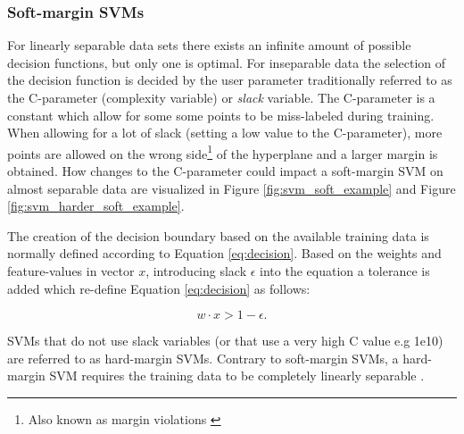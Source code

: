 \documentclass[a4paper,twoside]{bth}
\begin{document}
\subsubsection{Soft-margin SVMs}
\par For linearly separable data sets there exists an infinite amount of possible decision functions, but only one is optimal. For inseparable data the selection of the decision function is decided by the user parameter traditionally referred to as the C-parameter \cite{Cortes:1995:SN:218919.218929} (complexity variable) or \textit{slack} variable. The C-parameter is a constant which allow for some some points to be miss-labeled during training. When allowing for a lot of slack (setting a low value to the C-parameter), more points are allowed on the wrong side\footnote{Also known as margin violations \cite{Flach:2012:MLA:2490546}} of the hyperplane and a larger margin is obtained. How changes to the C-parameter could impact a soft-margin SVM on almost separable data are visualized in Figure \ref{fig:svm_soft_example} and Figure \ref{fig:svm_harder_soft_example}.

\par The creation of the decision boundary based on the available training data is normally defined according to Equation \ref{eq:decision}. Based on the weights and feature-values in vector $x$, introducing slack $\epsilon$ into the equation a tolerance is added which re-define Equation \ref{eq:decision} as follows:

\begin{equation}\label{eq:soft_decision}
    w \cdot x > 1 - \epsilon. 
\end{equation}

\par SVMs that do not use slack variables (or that use a very high C value e.g 1e10)  are referred to as hard-margin SVMs. Contrary to soft-margin SVMs, a hard-margin SVM requires the training data to be completely linearly separable \cite{Cortes:1995:SN:218919.218929}.
\end{document}
